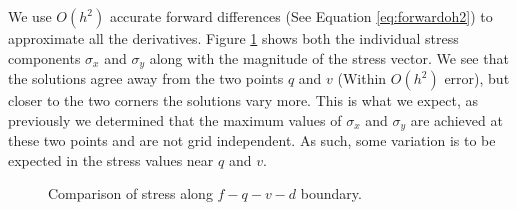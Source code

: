 \documentclass{article}
\numberwithin{equation}{section}
\theoremstyle{definition}
\begin{document}
We use $O(h^2)$ accurate forward differences (See Equation \eqref{eq:forwardoh2}) to approximate all the derivatives. Figure \ref{fig:fig15} shows both the individual stress components $\sigma_x$ and $\sigma_y$ along with the magnitude of the stress vector. We see that the solutions agree away from the two points $q$ and $v$ (Within $O(h^2)$ error), but closer to the two corners the solutions vary more. This is what we expect, as previously we determined that the maximum values of $\sigma_x$ and $\sigma_y$ are achieved at these two points and are not grid independent. As such, some variation is to be expected in the stress values near $q$ and $v$.

\begin{figure}[H]
    \centering
    \hfill
    \hfill
    \caption{Comparison of stress along $f-q-v-d$ boundary.}
    \label{fig:fig15}
\end{figure}
\end{document}
